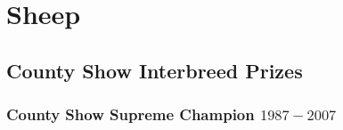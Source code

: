 \chapter{Sheep}
\section[Interbreed]{County Show Interbreed Prizes}
\subsection[Supreme Champion]{County Show Supreme Champion $1987 - 2007$}
\small

\normalsize



